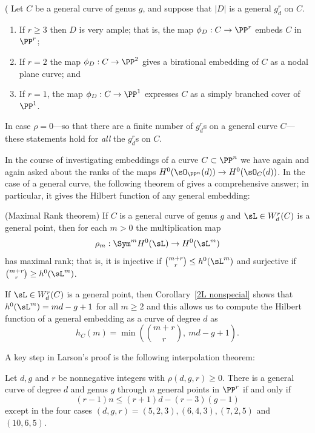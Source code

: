 \begin{theorem}\label{grd omnibus}(\cite[Proposition 5.4]{Eisenbud-Harris83}
Let $C$ be a general curve of genus $g$, and suppose that
$|D|$ is a general $g^r_d$ on $C$.

 \begin{enumerate}
\item If $r \geq 3$ then $D$ is very ample; that is, the map $\phi_D : C \to \PP^r$   embeds $C$ in $\PP^r$;
\item If $r=2$ the map $\phi_D : C \to \PP^2$ gives a birational embedding of $C$ as a nodal plane curve; and 
\item If $r=1$, the map $\phi_D : C \to \PP^1$ expresses $C$ as a simply branched cover of $\PP^1$.
\end{enumerate}
\end{theorem}

In case $\rho = 0$---so that there are a finite number of $g^r_d$s on a general curve $C$---these statements hold for \emph{all} the $g^r_d$s on $C$.

In the course of investigating embeddings of a curve $C\subset \PP^n$ we have again and again
asked about the ranks of the maps $H^0(\sO_{\PP^n}(d)) \to H^0(\sO_C(d))$. In the case of
a general curve, the following theorem of \cite{Larson} gives a comprehensive answer; in particular, it gives
 the Hilbert function of any general embedding:
 
\begin{theorem}[Larson](Maximal Rank theorem)\label{maximal rank}
If $C$ is a general curve of genus $g$ and $\sL  \in W^r_d(C)$ is a general point, then for each $m > 0$ the multiplication map
$$
\rho_m : \Sym^m H^0(\sL ) \to H^0(\sL ^m)
$$
has maximal rank; that is, it is injective if $\binom{m+r}{r} \leq h^0(\sL ^m)$ and surjective if $\binom{m+r}{r} \geq h^0(\sL ^m)$.
\end{theorem}


If $\sL\in W^r_d(C)$ is a general point, then Corollary~\ref{2L nonspecial} shows that 
$h^0(\sL ^m) = md-g+1$ for all $m \geq 2$
and this allows us to compute the Hilbert function of a general embedding as a curve
of degree $d$ as 
 $$
 h_C(m) = \min\left(\binom{m+r}{r},\ md-g+1\right).
 $$
 


A key step in Larson's proof is the following interpolation theorem:

\begin{theorem}[\cite{MR4653767}]\label{Larson-Vogt}
Let $d, g$ and $r$
be nonnegative integers with $\rho(d, g, r) \geq 0$. There is a general curve of degree $d$ and genus $g$ through $n$ general
points in $\PP^r$
if and only if
$$
(r-1)n \leq (r + 1)d-(r-3)(g-1)
$$
except in the four cases $(d, g, r) = (5, 2, 3),(6, 4, 3),(7, 2, 5)$ and $(10, 6, 5)$.

 \end{theorem}
 
